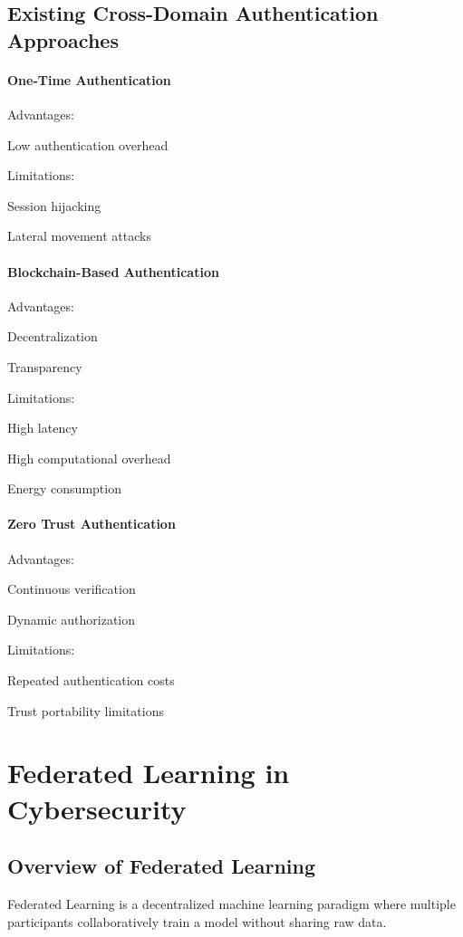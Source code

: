 \subsection{Existing Cross-Domain Authentication Approaches}

\paragraph{One-Time Authentication}

Advantages:


Low authentication overhead


Limitations:


Session hijacking


Lateral movement attacks


\paragraph{Blockchain-Based Authentication}

Advantages:


Decentralization


Transparency


Limitations:


High latency


High computational overhead


Energy consumption


\paragraph{Zero Trust Authentication}

Advantages:


Continuous verification


Dynamic authorization


Limitations:


Repeated authentication costs


Trust portability limitations


\section{Federated Learning in Cybersecurity}

\subsection{Overview of Federated Learning}

Federated Learning is a decentralized machine learning paradigm where multiple participants collaboratively train a model without sharing raw data.


